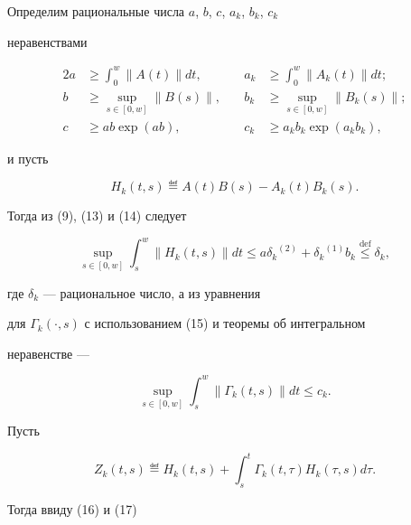 \begin{pf}


Определим рациональные числа $a$, $b$, $c$, $a_k$, $b_k$, $c_k$


неравенствами


\begin{alignat}{2}


a&\ge\int_0^w\|A(t)\|dt, &\quad a_k&\ge\int_0^w\|A_k(t)\|dt;\\


b&\ge\sup_{s\in[0,w]}\|B(s)\|, &\quad b_k&\ge\sup_{s\in[0,w]}\|B_k(s)\|;\\


c&\ge ab\exp(ab), &\quad c_k&\ge a_kb_k\exp(a_kb_k),


\end{alignat}


и пусть


$$


H_k(t,s)\eqdef A(t)B(s)-A_k(t)B_k(s).


$$


Тогда из (9), (13) и (14) следует


\begin{equation}


\sup_{s\in[0,w]}\int_s^w\|H_k(t,s)\|dt


\le a{\delta_k}^{(2)}+{\delta_k}^{(1)}b_k


\overset{\text{def}}{\le}{}\delta_k,


\end{equation}


где $\delta_k$ --- рациональное число, а из уравнения


для $\Gamma_k(\cdot,s)$ с использованием (15) и теоремы об интегральном


неравенстве ---


\begin{equation}


\sup_{s\in[0,w]}\int_s^w\|\Gamma_k(t,s)\|dt\le c_k.


\end{equation}





Пусть


$$


Z_k(t,s)\eqdef H_k(t,s)+\int_s^t\Gamma_k(t,\tau)H_k(\tau,s)d\tau.


$$


Тогда ввиду (16) и (17)


\begin{equation}



\end{equation}
\end{pf}
